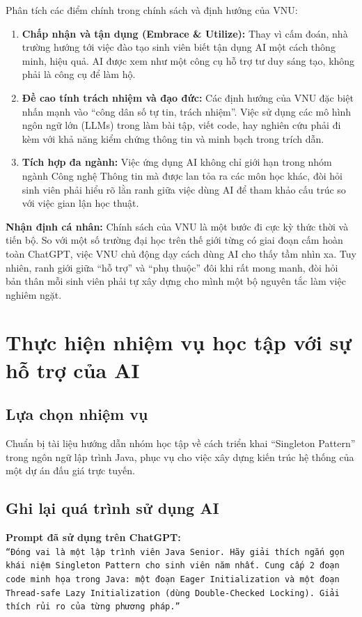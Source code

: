 \documentclass[12pt,a4paper]{article}
\begin{document}
Phân tích các điểm chính trong chính sách và định hướng của VNU:
\begin{enumerate}
    \item \textbf{Chấp nhận và tận dụng (Embrace \& Utilize):} Thay vì cấm đoán, nhà trường hướng tới việc đào tạo sinh viên biết tận dụng AI một cách thông minh, hiệu quả. AI được xem như một công cụ hỗ trợ tư duy sáng tạo, không phải là công cụ để làm hộ.
    \item \textbf{Đề cao tính trách nhiệm và đạo đức:} Các định hướng của VNU đặc biệt nhấn mạnh vào ``công dân số tự tin, trách nhiệm''. Việc sử dụng các mô hình ngôn ngữ lớn (LLMs) trong làm bài tập, viết code, hay nghiên cứu phải đi kèm với khả năng kiểm chứng thông tin và minh bạch trong trích dẫn.
    \item \textbf{Tích hợp đa ngành:} Việc ứng dụng AI không chỉ giới hạn trong nhóm ngành Công nghệ Thông tin mà được lan tỏa ra các môn học khác, đòi hỏi sinh viên phải hiểu rõ lằn ranh giữa việc dùng AI để tham khảo cấu trúc so với việc gian lận học thuật.
\end{enumerate}

\textbf{Nhận định cá nhân:} Chính sách của VNU là một bước đi cực kỳ thức thời và tiến bộ. So với một số trường đại học trên thế giới từng có giai đoạn cấm hoàn toàn ChatGPT, việc VNU chủ động dạy cách dùng AI cho thấy tầm nhìn xa. Tuy nhiên, ranh giới giữa ``hỗ trợ'' và ``phụ thuộc'' đôi khi rất mong manh, đòi hỏi bản thân mỗi sinh viên phải tự xây dựng cho mình một bộ nguyên tắc làm việc nghiêm ngặt.

\newpage
\section{Thực hiện nhiệm vụ học tập với sự hỗ trợ của AI}

\subsection{Lựa chọn nhiệm vụ}
Chuẩn bị tài liệu hướng dẫn nhóm học tập về cách triển khai ``Singleton Pattern'' trong ngôn ngữ lập trình Java, phục vụ cho việc xây dựng kiến trúc hệ thống của một dự án đấu giá trực tuyến.

\subsection{Ghi lại quá trình sử dụng AI}
\textbf{Prompt đã sử dụng trên ChatGPT:}
\\ \texttt{``Đóng vai là một lập trình viên Java Senior. Hãy giải thích ngắn gọn khái niệm Singleton Pattern cho sinh viên năm nhất. Cung cấp 2 đoạn code minh họa trong Java: một đoạn Eager Initialization và một đoạn Thread-safe Lazy Initialization (dùng Double-Checked Locking). Giải thích rủi ro của từng phương pháp.''}
\end{document}
